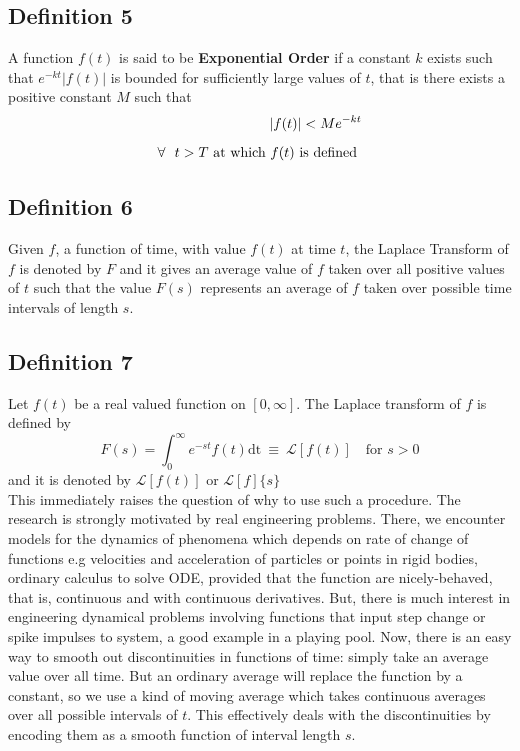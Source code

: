 \documentclass[11pt]{report}
\newcommand{\Laplace}{\mathcal{L}}
\newcommand{\ft}{f(t)}
\newcommand{\Fs}{F(s)}
\newcommand{\LaplaceIntegral}{\int_{0}^{\infty}e^{-st}\ft\text{dt}}
\newcommand{\sbracket}[1]{\left[#1\right]}
\newcommand{\LFt}{\Laplace \sbracket{\ft}}
\newcommand{\sps}{\\[0.2cm]}
\newcommand{\bt}[1]{\textbf{#1}}
\newcommand{\dsp}{\displaystyle}
\begin{document}
	\subsection{Definition 5}
	A function $\ft$ is said to be \bt{Exponential Order} if a constant $k$ exists such that $\dsp e^{-kt}|\ft|$ is bounded for sufficiently large values of $t$, that is there exists a positive constant $M$ such that
	\begin{eqnarray}
		|f(t)| < Me^{-kt}\sps
		\forall ~~t > T \text{ at which } \ft \text{ is defined }\notag
		\label{eq:2_1}
	\end{eqnarray}
	
	\subsection{Definition 6}
	Given $f$, a function of time, with value $\ft$ at time $t$, the Laplace Transform of $f$ is denoted by $F$ and it gives an average value of $f$ taken over all positive values of $t$ such that the value $F(s)$ represents an average of $f$ taken over possible time intervals of length $s$.
	
	\subsection{Definition 7}
	Let $\ft$ be a real valued function on $[0,\infty]$. The Laplace transform of $f$ is defined by
	\begin{equation}
		\Fs = \LaplaceIntegral ~\equiv~ \LFt ~~~ \text{ for } s > 0
		\label{eq:2_2}
	\end{equation}
	and it is denoted by $\LFt$ or $\Laplace[f]\{s\}$\sps
	
	This immediately raises the question of why to use such a procedure. The research is strongly motivated by real engineering problems. There, we encounter models for the dynamics of phenomena which depends on rate of change of functions e.g velocities and acceleration of particles or points in rigid bodies, ordinary calculus to solve ODE, provided that the function are nicely-behaved, that is, continuous and with continuous derivatives. But, there is much interest in engineering dynamical problems involving functions that input step change or spike impulses to system, a good example in a playing pool. Now, there is an easy way to smooth out discontinuities in functions of time: simply take an average value over all time. But an ordinary average will replace the function by a constant, so we use a kind of moving average which takes continuous averages over all possible intervals of $t$. This effectively deals with the discontinuities by encoding them as a smooth function of interval length $s$.\\
	
\end{document}
